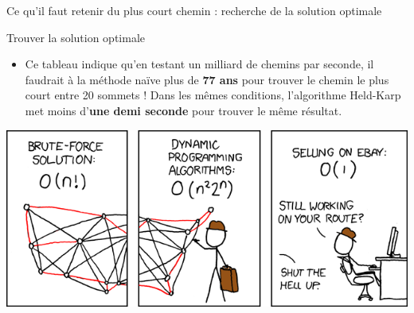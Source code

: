 \begin{frame}{Ce qu'il faut retenir du plus court chemin : recherche de la solution optimale}
\begin{block}{Trouver la solution optimale}
\begin{itemize}
      \bigskip

      \item Ce tableau indique qu'en testant un milliard de chemins par seconde, il faudrait à la méthode naïve plus de \textbf{77 ans} pour trouver le chemin le plus court entre 20 sommets ! Dans les mêmes conditions, l'algorithme Held-Karp met moins d'\textbf{une demi seconde} pour trouver le même résultat.
    \end{itemize}
  \end{block}

  \begin{center}
    \includegraphics[width=0.7\linewidth]{img/tsp_xkcd.png}
    \label{img:tsp_xkcd}
  \end{center}

\end{frame}

